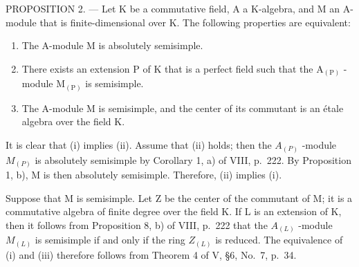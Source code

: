 PROPOSITION 2. --- Let K be a commutative field, A a K-algebra, and M an A-module that is finite-dimensional over K. The following properties are equivalent:

\begin{enumerate}
\def\labelenumi{(\roman{enumi})}
\item
  The A-module M is absolutely semisimple.
\item
  There exists an extension \(\mathrm{P}\) of \(\mathrm{K}\) that is a perfect field such that the \(\mathrm{A}_{(\mathrm{P})}\) -module \(\mathrm{M}_{(\mathrm{P})}\) is semisimple.
\item
  The A-module M is semisimple, and the center of its commutant is an étale algebra over the field K.
\end{enumerate}

It is clear that (i) implies (ii). Assume that (ii) holds; then the \(A_{(P)}\) -module \(M_{(P)}\) is absolutely semisimple by Corollary 1, a) of VIII, p.~222. By Proposition 1, b), M is then absolutely semisimple. Therefore, (ii) implies (i).

Suppose that M is semisimple. Let Z be the center of the commutant of M; it is a commutative algebra of finite degree over the field K. If L is an extension of K, then it follows from Proposition 8, b) of VIII, p.~222 that the \(A_{(L)}\) -module \(M_{(L)}\) is semisimple if and only if the ring \(Z_{(L)}\) is reduced. The equivalence of (i) and (iii) therefore follows from Theorem 4 of V, §6, No.~7, p.~34.

